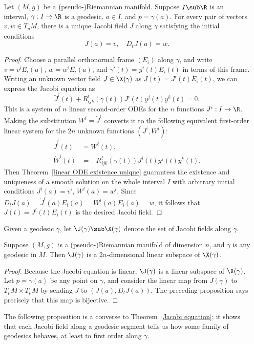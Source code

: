 \begin{proposition}\label{Riemann Jacobi field unique}
Let $(M,g)$ be a (pseudo-)Riemannian manifold. Suppose $I\sub\R$ is an interval, $\gamma:I\to\R$ is a geodesic, $a\in I$, and $p=\gamma(a)$. For every pair of vectors $v,w\in T_pM$, there is a unique Jacobi field $J$ along $\gamma$ satisfying the initial conditions
\[J(a)=v,\quad D_tJ(a)=w.\]
\end{proposition}
\begin{proof}
Choose a parallel orthonormal frame $(E_i)$ along $\gamma$, and write $v=v^iE_i(a)$, $w=w^iE_i(a)$, and $\gamma'(t)=y^i(t)E_i(t)$ in terms of this frame. Writing an unknown vector field $J\in\X(\gamma)$ as $J(t)=J^i(t)E_i(t)$, we can express the Jacobi equation as
\[\ddot{J}^l(t)+R_{ijk}^l(\gamma(t))J^i(t)y^j(t)y^k(t)=0.\]
This is a system of $n$ linear second-order ODEs for the $n$ functions $J^i:I\to\R$. Making the substitution $W^i=\dot{J}^i$ converts it to the following equivalent first-order linear system for the $2n$ unknown functions $(J^i,W^i)$:
\begin{align*}
\dot{J}^i(t)&=W^i(t),\\
\dot{W}^i(t)&=-R_{ijk}^l(\gamma(t))J^i(t)y^j(t)y^k(t).
\end{align*}
Then Theorem~\ref{linear ODE existence unique} guarantees the existence and uniqueness of a smooth solution on the whole interval $I$ with arbitrary initial conditions $J^i(a)=v^i$, $W^i(a)=w^i$. Since $D_tJ(a)=\dot{J}^i(a)E_i(a)=W^i(a)E_i(a)=w$, it follows that $J(t)=J^i(t)E_i(t)$ is the desired Jacobi field.
\end{proof}
Given a geodesic $\gamma$, let $\J(\gamma)\sub\X(\gamma)$ denote the set of Jacobi fields along $\gamma$.
\begin{corollary}\label{Riemann Jacobi field dim}
Suppose $(M,g)$ is a (pseudo-)Riemannian manifold of dimension $n$, and $\gamma$ is any geodesic in $M$. Then $\J(\gamma)$ is a $2n$-dimensional linear subspace of $\X(\gamma)$.
\end{corollary}
\begin{proof}
Because the Jacobi equation is linear, $\J(\gamma)$ is a linear subspace of $\X(\gamma)$. Let $p=\gamma(a)$ be any point on $\gamma$, and consider the linear map from $J(\gamma)$ to $T_pM\times T_pM$ by sending $J$ to $(J(a),D_tJ(a))$. The preceding proposition says precisely that this map is bijective.
\end{proof}
The following proposition is a converse to Theorem~\ref{Jacobi equation}; it shows that each Jacobi field along a geodesic segment tells us how some family of geodesics behaves, at least to first order along $\gamma$.

